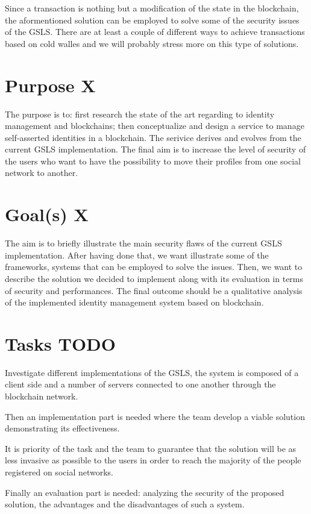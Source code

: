 \documentclass[paper=a4, fontsize=11pt]{scrartcl} %
\numberwithin{equation}{section} %
\numberwithin{figure}{section} %
\numberwithin{table}{section} %
\begin{document}
Since a transaction is nothing but a modification of the state in the blockchain, the aformentioned solution can be employed to solve some of the security issues of the GSLS. There are at least a couple of different ways to achieve transactions based on cold walles \cite{icebox} \cite{light-wallet} and we will probably stress more on this type of solutions. 

\section{Purpose X}
The purpose is to: first research the state of the art regarding to identity management and blockchains; then conceptualize and design a service to manage self-asserted identities in a blockchain. The serivice derives and evolves from the current GSLS implementation. The final aim is to increase the level of security of the users who want to have the possibility to move their profiles from one social network to another. 

\section{Goal(s) X}
The aim is to briefly illustrate the main security flaws of the current GSLS implementation. After having done that, we want illustrate some of the frameworks, systems that can be employed to solve the issues. Then, we want to describe the solution we decided to implement along with its evaluation in terms of security and performances. The final outcome should be a qualitative analysis of the implemented identity management system based on blockchain. 

\section{Tasks TODO}

Investigate different implementations of the GSLS, the system is composed of a client side and a number of servers connected to one another through the blockchain network. 

Then an implementation part is needed where the team develop a viable solution demonstrating its effectiveness.

It is priority of the task and the team to guarantee that the solution will be as less invasive as possible to the users in order to reach the majority of the people registered on social networks.

Finally an evaluation part is needed: analyzing the security of the proposed solution, the advantages and the disadvantages of such a system.
\end{document}
